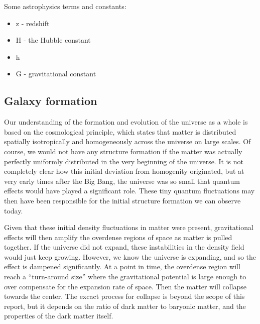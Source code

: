 Some astrophysics terms and constants:

\begin{itemize}
    \item z - redshift
    \item H - the Hubble constant
    \item h
    \item G - gravitational constant

\end{itemize}

\subsection{Galaxy formation}

Our understanding of the formation and evolution of the universe as a whole is based on the cosmological principle, which states that matter is distributed spatially isotropically and homogeneously across the universe on large scales. Of course, we would not have any structure formation if the matter was actually perfectly uniformly distributed in the very beginning of the universe. It is not completely clear how this initial deviation from homogenity originated, but at very early times after the Big Bang, the universe was so small that quantum effects would have played a significant role. These tiny quantum fluctuations may then have been responsible for the initial structure formation we can observe today.

Given that these initial density fluctuations in matter were present, gravitational effects will then amplify the overdense regions of space as matter is pulled together. If the universe did not expand, these instabilities in the density field would just keep growing. However, we know the universe is expanding, and so the effect is dampened significantly. At a point in time, the overdense region will reach a ``turn-around size'' where the gravitational potential is large enough to over compensate for the expansion rate of space. Then the matter will collapse towards the center. The excact process for collapse is beyond the scope of this report, but it depends on the ratio of dark matter to baryonic matter, and the properties of the dark matter itself. 

